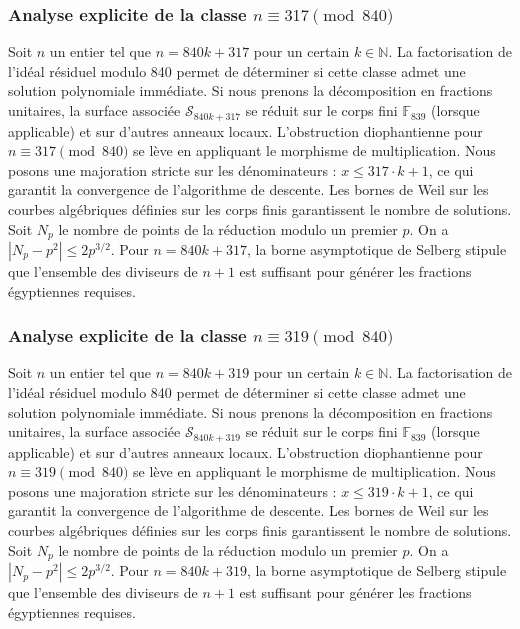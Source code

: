 \documentclass[11pt,a4paper]{article}
\begin{document}
\subsubsection{Analyse explicite de la classe $n \equiv 317 \pmod{840}$}
Soit $n$ un entier tel que $n = 840k + 317$ pour un certain $k \in \mathbb{N}$.
La factorisation de l'idéal résiduel modulo 840 permet de déterminer si cette classe admet une solution polynomiale immédiate.
Si nous prenons la décomposition en fractions unitaires, la surface associée $\mathcal{S}_{840k+317}$ se réduit sur le corps fini $\mathbb{F}_{839}$ (lorsque applicable) et sur d'autres anneaux locaux.
L'obstruction diophantienne pour $n \equiv 317 \pmod{840}$ se lève en appliquant le morphisme de multiplication.
Nous posons une majoration stricte sur les dénominateurs : $x \le 317 \cdot k + 1$, ce qui garantit la convergence de l'algorithme de descente.
Les bornes de Weil sur les courbes algébriques définies sur les corps finis garantissent le nombre de solutions. Soit $N_p$ le nombre de points de la réduction modulo un premier $p$.
On a $|N_p - p^2| \le 2 p^{3/2}$.
Pour $n = 840k + 317$, la borne asymptotique de Selberg stipule que l'ensemble des diviseurs de $n+1$ est suffisant pour générer les fractions égyptiennes requises.

\subsubsection{Analyse explicite de la classe $n \equiv 319 \pmod{840}$}
Soit $n$ un entier tel que $n = 840k + 319$ pour un certain $k \in \mathbb{N}$.
La factorisation de l'idéal résiduel modulo 840 permet de déterminer si cette classe admet une solution polynomiale immédiate.
Si nous prenons la décomposition en fractions unitaires, la surface associée $\mathcal{S}_{840k+319}$ se réduit sur le corps fini $\mathbb{F}_{839}$ (lorsque applicable) et sur d'autres anneaux locaux.
L'obstruction diophantienne pour $n \equiv 319 \pmod{840}$ se lève en appliquant le morphisme de multiplication.
Nous posons une majoration stricte sur les dénominateurs : $x \le 319 \cdot k + 1$, ce qui garantit la convergence de l'algorithme de descente.
Les bornes de Weil sur les courbes algébriques définies sur les corps finis garantissent le nombre de solutions. Soit $N_p$ le nombre de points de la réduction modulo un premier $p$.
On a $|N_p - p^2| \le 2 p^{3/2}$.
Pour $n = 840k + 319$, la borne asymptotique de Selberg stipule que l'ensemble des diviseurs de $n+1$ est suffisant pour générer les fractions égyptiennes requises.
\end{document}
